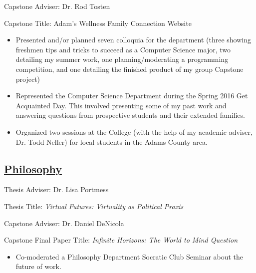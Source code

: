 \documentclass[11pt]{article}
\begin{document}
Capstone Adviser: Dr. Rod Tosten

Capstone Title: Adam's Wellness Family Connection Website

\begin{itemize}
\item Presented and/or planned seven colloquia for the department (three showing freshmen tips and tricks to succeed as a Computer Science major, two detailing my summer work, one planning/moderating a programming competition, and one detailing the finished product of my group Capstone project)
\item Represented the Computer Science Department during the Spring 2016 Get Acquainted Day. This involved presenting some of my past work and answering questions from prospective students and their extended families. 
\item Organized two  sessions at the College (with the help of my academic adviser, Dr. Todd Neller) for local students in the Adams County area.
\end{itemize}

\subsection*{\underline{Philosophy}}
Thesis Adviser: Dr. Lisa Portmess

Thesis Title: \textit{Virtual Futures: Virtuality as Political Praxis}

Capstone Adviser: Dr. Daniel DeNicola

Capstone Final Paper Title: \textit{Infinite Horizons: The World to Mind Question}

\begin{itemize}
\item Co-moderated a Philosophy Department Socratic Club Seminar about the future of work.
\end{itemize}
\end{document}
